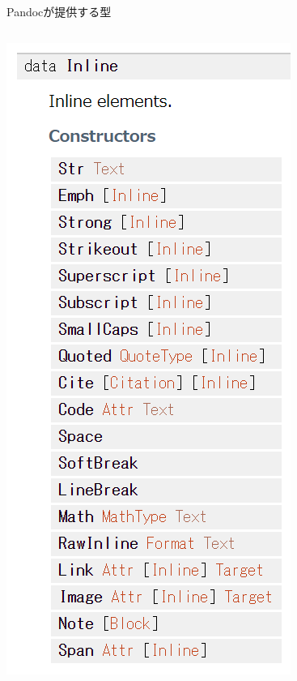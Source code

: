 \documentclass[14pt,dvipdfmx,uplatex]{beamer}
\begin{document}
\begin{frame}[t]{\inhibitglue Pandocが提供する型}
\begin{center}
\begin{columns}[c]
\begin{column}{.3\textwidth}
      \includegraphics[width=\textwidth]{figures/pandoc-type-inline.png}
      \end{column}
    \end{columns}
  \end{center}
\end{frame}
\end{document}

